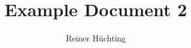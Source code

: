\documentclass{scrartcl}
\title{Example Document 2}
\author{Reiner Hüchting}
\begin{document}
    \maketitle

    \lipsum{}
\end{document}
